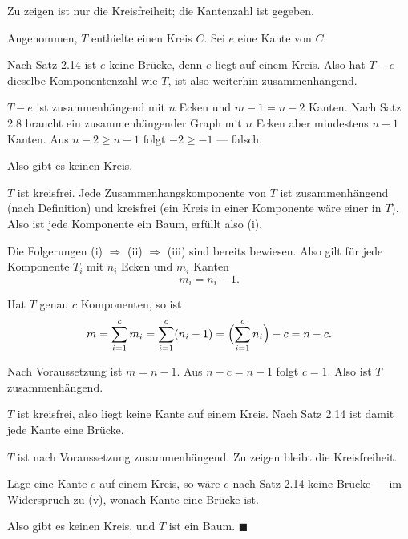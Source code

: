 \begin{merksatz}
Zu zeigen ist nur die Kreisfreiheit; die Kantenzahl ist gegeben.

Angenommen, $T$ enthielte einen Kreis $C$. Sei $e$ eine Kante von $C$.

Nach Satz 2.14 ist $e$ keine Brücke, denn $e$ liegt auf einem Kreis. Also hat $T - e$ dieselbe Komponentenzahl wie $T$, ist also weiterhin zusammenhängend.

$T-e$ ist zusammenhängend mit $n$ Ecken und $m - 1 = n - 2$ Kanten. Nach Satz 2.8 braucht ein zusammenhängender Graph mit $n$ Ecken aber mindestens $n-1$ Kanten. Aus $n-2 \ge n-1$ folgt $-2 \ge -1$ --- falsch.

Also gibt es keinen Kreis.
\end{merksatz}

\begin{merksatz}
$T$ ist kreisfrei. Jede Zusammenhangskomponente von $T$ ist zusammenhängend (nach Definition) und kreisfrei (ein Kreis in einer Komponente wäre einer in $T$). Also ist jede Komponente ein Baum, erfüllt also (i).

Die Folgerungen (i) $\Rightarrow$ (ii) $\Rightarrow$ (iii) sind bereits bewiesen. Also gilt für jede Komponente $T_i$ mit $n_i$ Ecken und $m_i$ Kanten
\[ m_i = n_i - 1 . \]

Hat $T$ genau $c$ Komponenten, so ist
\[ m = \sum_{i=1}^{c} m_i = \sum_{i=1}^{c} (n_i - 1) = \Bigl(\sum_{i=1}^{c} n_i\Bigr) - c = n - c . \]

Nach Voraussetzung ist $m = n-1$. Aus $n - c = n - 1$ folgt $c = 1$. Also ist $T$ zusammenhängend.

$T$ ist kreisfrei, also liegt keine Kante auf einem Kreis. Nach Satz 2.14 ist damit jede Kante eine Brücke.
\end{merksatz}

\begin{merksatz}
$T$ ist nach Voraussetzung zusammenhängend. Zu zeigen bleibt die Kreisfreiheit.

Läge eine Kante $e$ auf einem Kreis, so wäre $e$ nach Satz 2.14 keine Brücke --- im Widerspruch zu (v), wonach  Kante eine Brücke ist.

Also gibt es keinen Kreis, und $T$ ist ein Baum. $\blacksquare$

\begin{center}
\begin{minipage}{0.88\textwidth}
\end{minipage}
\end{center}
\end{merksatz}

